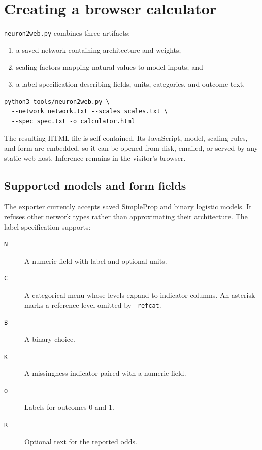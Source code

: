 \section{Creating a browser calculator}

\texttt{neuron2web.py} combines three artifacts:

\begin{enumerate}
\item a saved network containing architecture and weights;
\item scaling factors mapping natural values to model inputs; and
\item a label specification describing fields, units, categories, and
outcome text.
\end{enumerate}

\begin{verbatim}
python3 tools/neuron2web.py \
  --network network.txt --scales scales.txt \
  --spec spec.txt -o calculator.html
\end{verbatim}

The resulting HTML file is self-contained.  Its JavaScript, model,
scaling rules, and form are embedded, so it can be opened from disk,
emailed, or served by any static web host.  Inference remains in the
visitor's browser.

\subsection{Supported models and form fields}

The exporter currently accepts saved SimpleProp and binary logistic
models.  It refuses other network types rather than approximating
their architecture.  The label specification supports:

\begin{description}
\item[\texttt{N}] A numeric field with label and optional units.
\item[\texttt{C}] A categorical menu whose levels expand to indicator
columns.  An asterisk marks a reference level omitted by
\texttt{--refcat}.
\item[\texttt{B}] A binary choice.
\item[\texttt{K}] A missingness indicator paired with a numeric field.
\item[\texttt{O}] Labels for outcomes 0 and 1.
\item[\texttt{R}] Optional text for the reported odds.
\end{description}

